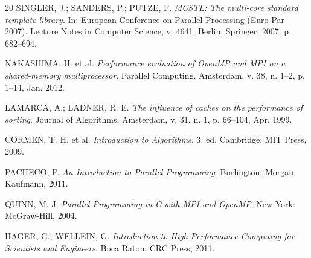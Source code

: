 \documentclass[12pt]{article}
\begin{document}
\begin{thebibliography}{20}
SINGLER, J.; SANDERS, P.; PUTZE, F.
\textit{MCSTL: The multi-core standard template library}.
In: European Conference on Parallel Processing (Euro-Par 2007). Lecture Notes in Computer Science, v. 4641. Berlin: Springer, 2007. p. 682--694.

NAKASHIMA, H. et al.
\textit{Performance evaluation of OpenMP and MPI on a shared-memory multiprocessor}.
Parallel Computing, Amsterdam, v. 38, n. 1--2, p. 1--14, Jan. 2012.

LAMARCA, A.; LADNER, R. E.
\textit{The influence of caches on the performance of sorting}.
Journal of Algorithms, Amsterdam, v. 31, n. 1, p. 66--104, Apr. 1999.

CORMEN, T. H. et al.
\textit{Introduction to Algorithms}. 3. ed. Cambridge: MIT Press, 2009.

PACHECO, P.
\textit{An Introduction to Parallel Programming}.
Burlington: Morgan Kaufmann, 2011.

QUINN, M. J.
\textit{Parallel Programming in C with MPI and OpenMP}.
New York: McGraw-Hill, 2004.

HAGER, G.; WELLEIN, G.
\textit{Introduction to High Performance Computing for Scientists and Engineers}.
Boca Raton: CRC Press, 2011.

\end{thebibliography}
\end{document}
